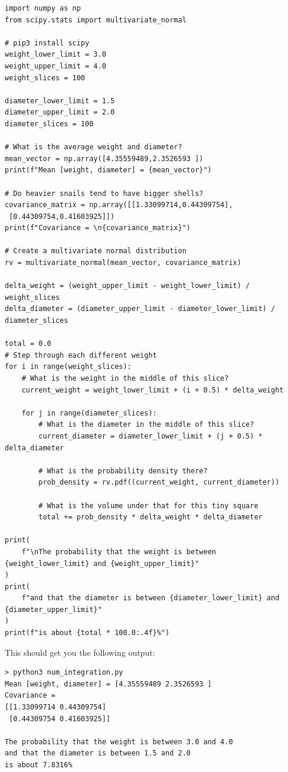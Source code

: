 \begin{verbatim}
import numpy as np
from scipy.stats import multivariate_normal

# pip3 install scipy
weight_lower_limit = 3.0
weight_upper_limit = 4.0
weight_slices = 100

diameter_lower_limit = 1.5
diameter_upper_limit = 2.0
diameter_slices = 100

# What is the average weight and diameter?
mean_vector = np.array([4.35559489,2.3526593 ])
print(f"Mean [weight, diameter] = {mean_vector}")

# Do heavier snails tend to have bigger shells?
covariance_matrix = np.array([[1.33099714,0.44309754],
 [0.44309754,0.41603925]])
print(f"Covariance = \n{covariance_matrix}")

# Create a multivariate normal distribution
rv = multivariate_normal(mean_vector, covariance_matrix)

delta_weight = (weight_upper_limit - weight_lower_limit) / weight_slices
delta_diameter = (diameter_upper_limit - diameter_lower_limit) / diameter_slices

total = 0.0
# Step through each different weight
for i in range(weight_slices):
    # What is the weight in the middle of this slice?
    current_weight = weight_lower_limit + (i + 0.5) * delta_weight

    for j in range(diameter_slices):
        # What is the diameter in the middle of this slice?
        current_diameter = diameter_lower_limit + (j + 0.5) * delta_diameter

        # What is the probability density there?
        prob_density = rv.pdf((current_weight, current_diameter))

        # What is the volume under that for this tiny square
        total += prob_density * delta_weight * delta_diameter

print(
    f"\nThe probability that the weight is between {weight_lower_limit} and {weight_upper_limit}"
)
print(
    f"and that the diameter is between {diameter_lower_limit} and {diameter_upper_limit}"
)
print(f"is about {total * 100.0:.4f}%")
\end{verbatim}

This should get you the following output:

\begin{verbatim}
> python3 num_integration.py
Mean [weight, diameter] = [4.35559489 2.3526593 ]
Covariance =
[[1.33099714 0.44309754]
 [0.44309754 0.41603925]]

The probability that the weight is between 3.0 and 4.0
and that the diameter is between 1.5 and 2.0
is about 7.8316%
\end{verbatim}

